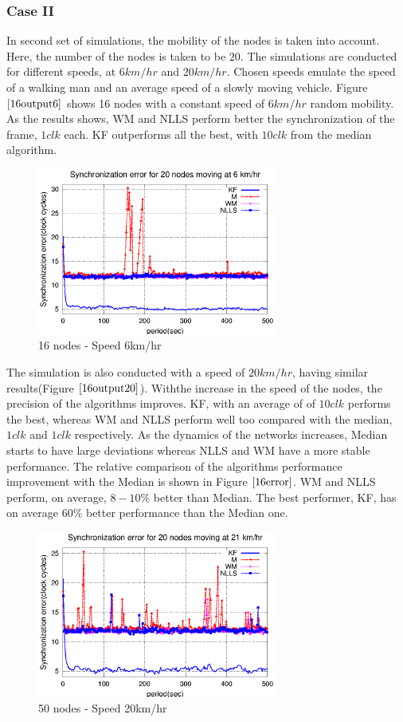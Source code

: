 \documentclass[a4paper,10pt]{report}
\begin{document}
\subsubsection{\textbf{Case II}}
In second set of simulations, the mobility of the nodes is taken into account. Here, the number of the nodes is taken to be $20$. The simulations are conducted for different speeds, at $6km/hr$ and $20km/hr$. Chosen speeds emulate the speed of a walking man and an average speed of a slowly moving vehicle. 
\newline 
Figure $\ref{16output6}$ shows 16 nodes with a constant speed of $6km/hr$ random mobility. As the results shows, WM and NLLS perform better the synchronization of the frame, $1 clk$ each. KF outperforms all the best, with $10 clk$ from the median
algorithm.
\newline
\begin{figure}
\centering
\includegraphics[width=0.7\textwidth]{16output-s6}
\caption{16 nodes - Speed 6km/hr} \label{16output6}
\end{figure}
The simulation is also conducted with a speed of $20km/hr$, having similar results(Figure $\ref{16output20}$). Withthe increase in the speed of the nodes, the precision of the algorithms improves. KF, with an average of of $10 clk$ performs the best, whereas WM and NLLS perform well too compared with the median, $1 clk$ and $1 clk$ respectively. As the dynamics of the networks increases, Median starts to have large deviations whereas NLLS and WM have a more stable performance. 
\newline 
The relative comparison of the algorithms performance improvement with the Median is shown in Figure $\ref{16error}$. WM and NLLS perform, on average, $8-10\%$ better than Median. The best performer, KF, has on average $60\%$ better performance than the Median one.
\begin{figure}
\centering
\includegraphics[width=0.7\textwidth]{16output-s20}
\caption{50 nodes - Speed 20km/hr} \label{16output20}
\end{figure}
\end{document}
